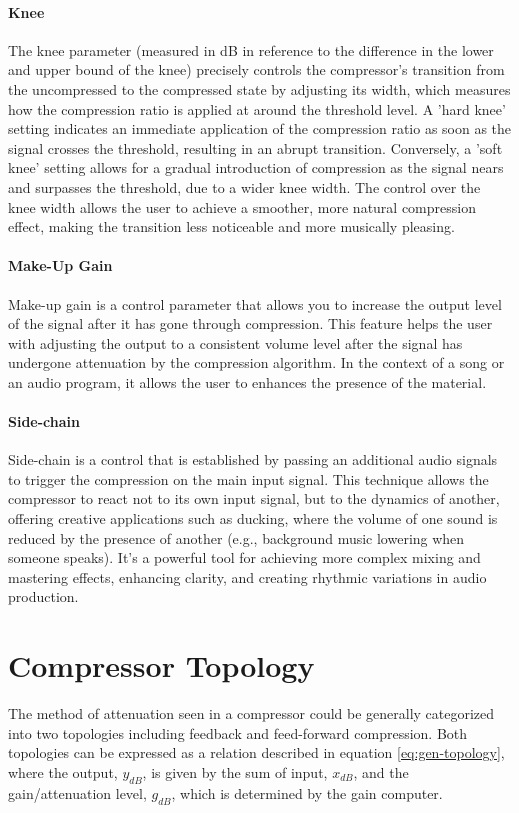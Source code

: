 \documentclass[10pt]{article}
\begin{document}
\begin{multicols*}{2}
            \paragraph{Knee}
                The knee parameter (measured in dB in reference to the difference in the lower and upper bound of the knee) precisely controls the compressor's transition from the uncompressed to the compressed state by adjusting its width, which measures how the compression ratio is applied at around the threshold level. A 'hard knee' setting indicates an immediate application of the compression ratio as soon as the signal crosses the threshold, resulting in an abrupt transition. Conversely, a 'soft knee' setting allows for a gradual introduction of compression as the signal nears and surpasses the threshold, due to a wider knee width. The control over the knee width allows the user to achieve a smoother, more natural compression effect, making the transition less noticeable and more musically pleasing.
            
            \paragraph{Make-Up Gain}
                Make-up gain is a control parameter that allows you to increase the output level of the signal after it has gone through compression. This feature helps the user with adjusting the output to a consistent volume level after the signal has undergone attenuation by the compression algorithm. In the context of a song or an audio program, it allows the user to enhances the presence of the material.

            \paragraph{Side-chain}
                Side-chain is a control that is established by passing an additional audio signals to trigger the compression on the main input signal. This technique allows the compressor to react not to its own input signal, but to the dynamics of another, offering creative applications such as ducking, where the volume of one sound is reduced by the presence of another (e.g., background music lowering when someone speaks). It's a powerful tool for achieving more complex mixing and mastering effects, enhancing clarity, and creating rhythmic variations in audio production.

        \section{Compressor Topology} \label{sec:comp-tpgy}
            The method of attenuation seen in a compressor could be generally categorized into two topologies including feedback and feed-forward compression. Both topologies can be expressed as a relation described in equation \ref{eq:gen-topology}, where the output, $y_{dB}$, is given by the sum of input, $x_{dB}$, and the gain/attenuation level, $g_{dB}$, which is determined by the gain computer. 


\end{multicols*}
\end{document}
